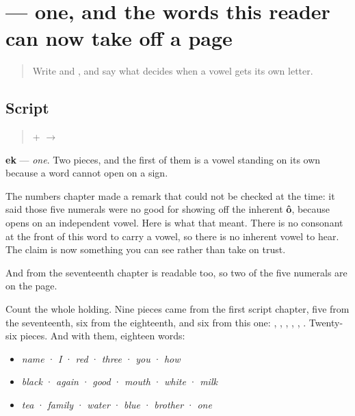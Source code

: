 \section[ek]{ — one, and the words this reader can now take off a page}

\label{lesson:BN-W04-ek-read}



\begin{quote}
Write \textbf{} and \textbf{}, and say what decides when a vowel gets its own letter.
\end{quote}

\subsection*{Script}
\begin{quote}
\textbf{} + \textbf{} $\to$ \textbf{}
\end{quote}

\textbf{ek} — \emph{one}. Two pieces, and the first of them is a vowel standing on its own because a word cannot open on a sign.

The numbers chapter made a remark that could not be checked at the time: it said those five numerals were no good for showing off the inherent \textbf{ô}, because \textbf{} opens on an independent vowel. Here is what that meant. There is no consonant at the front of this word to carry a vowel, so there is no inherent vowel to hear. The claim is now something you can see rather than take on trust.

And \textbf{} from the seventeenth chapter is readable too, so two of the five numerals are on the page.

Count the whole holding. Nine pieces came from the first script chapter, five from the seventeenth, six from the eighteenth, and six from this one: \textbf{}, \textbf{}, \textbf{}, \textbf{}, \textbf{}, \textbf{}. Twenty-six pieces. And with them, eighteen words:

\begin{itemize}
\raggedright
  \item \textbf{} \emph{name} · \textbf{} \emph{I} · \textbf{} \emph{red} · \textbf{} \emph{three} · \textbf{} \emph{you} · \textbf{} \emph{how}
  \item \textbf{} \emph{black} · \textbf{} \emph{again} · \textbf{} \emph{good} · \textbf{} \emph{mouth} · \textbf{} \emph{white} · \textbf{} \emph{milk}
  \item \textbf{} \emph{tea} · \textbf{} \emph{family} · \textbf{} \emph{water} · \textbf{} \emph{blue} · \textbf{} \emph{brother} · \textbf{} \emph{one}
\end{itemize}

